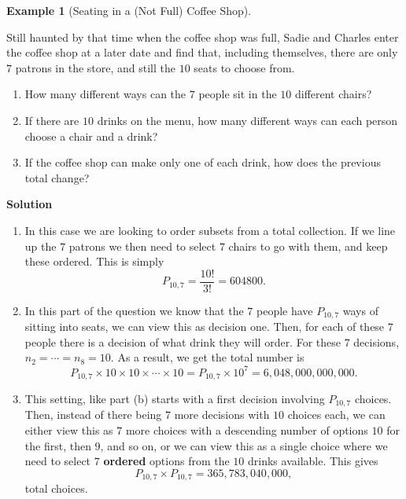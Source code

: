 \documentclass[
  letterpaper,
  DIV=11,
  numbers=noendperiod]{scrreprt}
\providecommand{\tightlist}{%
  \setlength{\itemsep}{0pt}\setlength{\parskip}{0pt}}\usepackage{longtable,booktabs,array}
\theoremstyle{definition}
\theoremstyle{definition}
\theoremstyle{definition}
\newtheorem{example}{Example}[chapter]
\theoremstyle{remark}
\begin{document}
\begin{example}[Seating in a (Not Full) Coffee
Shop]\protect\hypertarget{exm-permutations}{}\label{exm-permutations}

Still haunted by that time when the coffee shop was full, Sadie and
Charles enter the coffee shop at a later date and find that, including
themselves, there are only \(7\) patrons in the store, and still the
\(10\) seats to choose from.

\begin{enumerate}
\def\labelenumi{\alph{enumi}.}
\tightlist
\item
  How many different ways can the \(7\) people sit in the \(10\)
  different chairs?
\item
  If there are \(10\) drinks on the menu, how many different ways can
  each person choose a chair and a drink?
\item
  If the coffee shop can make only one of each drink, how does the
  previous total change?
\end{enumerate}

\begin{tcolorbox}[enhanced jigsaw, colback=white, breakable, rightrule=.15mm, leftrule=.75mm, toprule=.15mm, left=2mm, arc=.35mm, opacityback=0, bottomrule=.15mm]

\vspace{-3mm}\textbf{Solution}\vspace{3mm}

\begin{enumerate}
\def\labelenumi{\alph{enumi}.}
\item
  In this case we are looking to order subsets from a total collection.
  If we line up the \(7\) patrons we then need to select \(7\) chairs to
  go with them, and keep these ordered. This is simply
  \[P_{10,7} = \frac{10!}{3!} = 604800.\]
\item
  In this part of the question we know that the \(7\) people have
  \(P_{10,7}\) ways of sitting into seats, we can view this as decision
  one. Then, for each of these \(7\) people there is a decision of what
  drink they will order. For these \(7\) decisions,
  \(n_2 = \cdots = n_8 = 10\). As a result, we get the total number is
  \[P_{10,7}\times10\times10\times\cdots\times10 = P_{10,7}\times 10^{7} = 6,048,000,000,000.\]
\item
  This setting, like part (b) starts with a first decision involving
  \(P_{10,7}\) choices. Then, instead of there being \(7\) more
  decisions with \(10\) choices each, we can either view this as \(7\)
  more choices with a descending number of options \(10\) for the first,
  then \(9\), and so on, or we can view this as a single choice where we
  need to select \(7\) \textbf{ordered} options from the \(10\) drinks
  available. This gives \[P_{10,7} \times P_{10,7} = 365,783,040,000,\]
  total choices.
\end{enumerate}

\end{tcolorbox}

\end{example}
\end{document}
